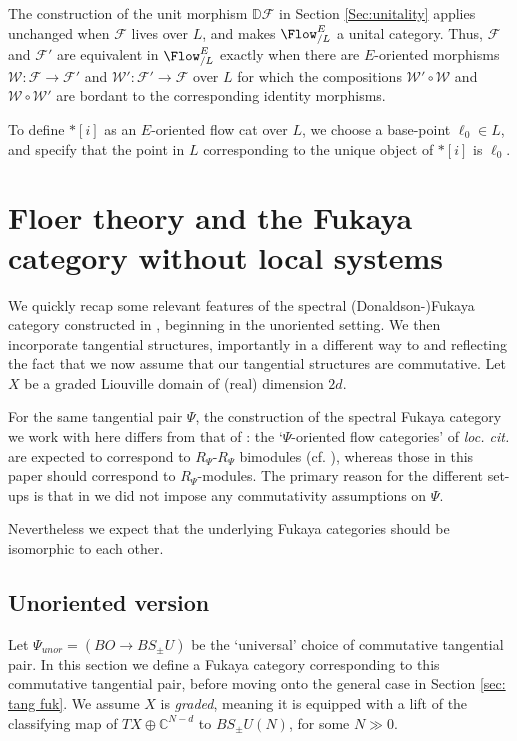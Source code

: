 \documentclass{TPmod}
\def\bC{\mathbb{C}}
\def\bD{\mathbb{D}}
\newcommand{\cF}{\mathcal{F}}
\newcommand{\cW}{\mathcal{W}}
\numberwithin{equation}{section}
\begin{document}
The construction of the unit morphism $\bD\cF$ in Section \ref{Sec:unitality} applies unchanged when $\cF$ lives over $L$, and makes $\Flow^{E}_{/L}$ a unital category. Thus, $\cF$ and $\cF'$ are equivalent in $\Flow^{E}_{/L}$ exactly when there are $E$-oriented morphisms $\cW: \cF \to \cF'$ and $\cW': \cF' \to \cF$ over $L$ for which the compositions $\cW' \circ \cW$ and $\cW \circ \cW'$ are bordant to the corresponding identity morphisms.
    

        
       
    \begin{defn}
        To define $*[i]$ as an $E$-oriented flow cat over $L$, we choose a base-point $\ell_0 \in L$, and specify that the point in $L$ corresponding to the unique object of $*[i]$ is $\ell_0$.
    \end{defn}






\section{Floer theory and the Fukaya category without local systems}\label{sec: fuk no loc}
    We quickly recap some relevant features of the spectral (Donaldson-)Fukaya category constructed in \cite{PS}, beginning in the unoriented setting. We then incorporate tangential structures, importantly in a different way to \cite{PS2} and reflecting the fact that we now assume that our tangential structures are commutative. Let $X$ be a graded Liouville domain of (real) dimension $2d$. 

    \begin{rmk}
        For the same tangential pair $\Psi$, the construction of the spectral Fukaya category we work with here differs from that of \cite{PS2}: the `$\Psi$-oriented flow categories' of \textit{loc. cit.} are expected to correspond to $R_\Psi$-$R_\Psi$ bimodules (cf. \cite[Conjecture 5.10]{PS2}), whereas those in this paper should correspond to $R_\Psi$-modules. The primary reason for the different set-ups is that in \cite{PS2} we did not impose any commutativity assumptions on $\Psi$.

        Nevertheless we expect that the underlying Fukaya categories should be isomorphic to each other.
    \end{rmk}
\subsection{Unoriented version}\label{sec:unoriented category}
Let $\Psi_{unor} = (BO \to BS_\pm U)$ be the `universal' choice of commutative tangential pair. In this section we define a Fukaya category corresponding to this commutative tangential pair, before moving onto the general case in Section \ref{sec: tang fuk}. We assume $X$ is \emph{graded}, meaning it is equipped with a lift of the classifying map of $TX \oplus \bC^{N-d}$ to $BS_\pm U(N)$, for some $N \gg 0$.
\end{document}
